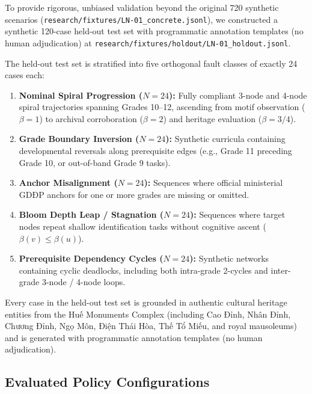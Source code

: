\documentclass[11pt,a4paper]{article}
\begin{document}
To provide rigorous, unbiased validation beyond the original 720 synthetic scenarios (\texttt{research/fixtures/LN-01\_concrete.jsonl}), we constructed a synthetic 120-case held-out test set with programmatic annotation templates (no human adjudication) at \texttt{research/fixtures/holdout/LN-01\_holdout.jsonl}.

The held-out test set is stratified into five orthogonal fault classes of exactly 24 cases each:
\begin{enumerate}
    \item \textbf{Nominal Spiral Progression ($N=24$):} Fully compliant 3-node and 4-node spiral trajectories spanning Grades 10--12, ascending from motif observation ($\beta=1$) to archival corroboration ($\beta=2$) and heritage evaluation ($\beta=3/4$).
    \item \textbf{Grade Boundary Inversion ($N=24$):} Synthetic curricula containing developmental reversals along prerequisite edges (e.g., Grade 11 preceding Grade 10, or out-of-band Grade 9 tasks).
    \item \textbf{Anchor Misalignment ($N=24$):} Sequences where official ministerial GDĐP anchors for one or more grades are missing or omitted.
    \item \textbf{Bloom Depth Leap / Stagnation ($N=24$):} Sequences where target nodes repeat shallow identification tasks without cognitive ascent ($\beta(v) \le \beta(u)$).
    \item \textbf{Prerequisite Dependency Cycles ($N=24$):} Synthetic networks containing cyclic deadlocks, including both intra-grade 2-cycles and inter-grade 3-node / 4-node loops.
\end{enumerate}

Every case in the held-out test set is grounded in authentic cultural heritage entities from the Huế Monuments Complex (including Cao Đỉnh, Nhân Đỉnh, Chương Đỉnh, Ngọ Môn, Điện Thái Hòa, Thế Tổ Miếu, and royal mausoleums) and is generated with programmatic annotation templates (no human adjudication).

\subsection{Evaluated Policy Configurations}
\end{document}
